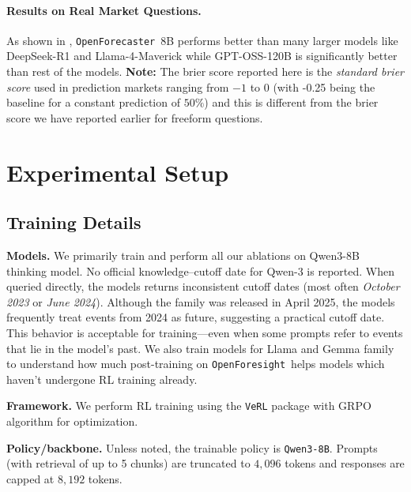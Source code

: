 \documentclass{article} %
\newcommand{\ourdataset}{\texttt{OpenForesight}}
\newcommand{\ourmodel}{\texttt{OpenForecaster}}
\begin{document}
\paragraph{Results on Real Market Questions.} As shown in , \ourmodel \ 8B performs better than many larger models like DeepSeek-R1 and Llama-4-Maverick while GPT-OSS-120B is significantly better than rest of the models. \textbf{Note:} The brier score reported here is the \emph{standard brier score} used in prediction markets ranging from $-1$ to $0$ (with -0.25 being the baseline for a constant prediction of $50\%$) and this is different from the brier score we have reported earlier for freeform questions. 





\section{Experimental Setup}

\subsection{Training Details}

\label{sec:setupdetails}

\textbf{Models.} We primarily train and perform all our ablations on Qwen3-8B~\citep{yang2025qwen3technicalreport} thinking model. No official knowledge–cutoff date for Qwen-3 is reported. When queried directly, the models returns inconsistent cutoff dates (most often \emph{October 2023} or \emph{June 2024}). 
Although the family was released in April 2025, the models frequently treat events from 2024 as future,  suggesting a practical cutoff date. This behavior is acceptable for training—even when some prompts refer to events that lie in the model’s past. We also train models for Llama and Gemma family to understand how much post-training on \ourdataset \ helps models which haven't undergone RL training already.  

\textbf{Framework.} We perform RL training using the \texttt{VeRL} package with GRPO algorithm \citep{shao2024deepseekmath} for optimization.

\textbf{Policy/backbone.} Unless noted, the trainable policy is \texttt{Qwen3-8B}. Prompts (with retrieval of up to 5 chunks) are truncated to $4{,}096$ tokens and responses are capped at $8{,}192$ tokens.
\end{document}
